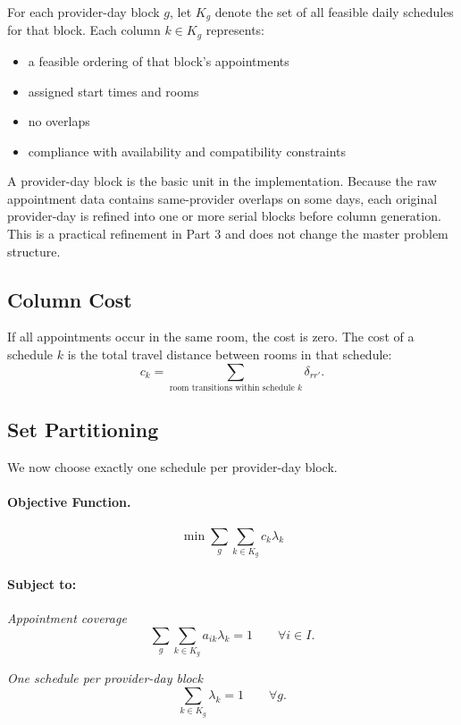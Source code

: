 \documentclass[12pt]{article}
\begin{document}
For each provider-day block $g$, let $K_g$ denote the set of all feasible daily schedules for
that block. Each column $k \in K_g$ represents:
\begin{itemize}
  \item a feasible ordering of that block's appointments
  \item assigned start times and rooms
  \item no overlaps
  \item compliance with availability and compatibility constraints
\end{itemize}

A provider-day block is the basic unit in the implementation. Because the raw appointment
data contains same-provider overlaps on some days, each original provider-day is refined into
one or more serial blocks before column generation. This is a practical refinement in Part 3
and does not change the master problem structure.

\subsection*{Column Cost}

If all appointments occur in the same room, the cost is zero. The cost of a schedule $k$ is
the total travel distance between rooms in that schedule:
\[
  c_k = \sum_{\text{room transitions within schedule } k} \delta_{rr'}.
\]

\subsection*{Set Partitioning}

We now choose exactly one schedule per provider-day block.

\paragraph{Objective Function.}
\[
  \min \sum_{g} \sum_{k \in K_g} c_k \lambda_k
\]

\paragraph{Subject to:}

\noindent\textit{Appointment coverage}
\[
  \sum_{g} \sum_{k \in K_g} a_{ik} \lambda_k = 1 \qquad \forall i \in I.
\]

\noindent\textit{One schedule per provider-day block}
\[
  \sum_{k \in K_g} \lambda_k = 1 \qquad \forall g.
\]
\end{document}
